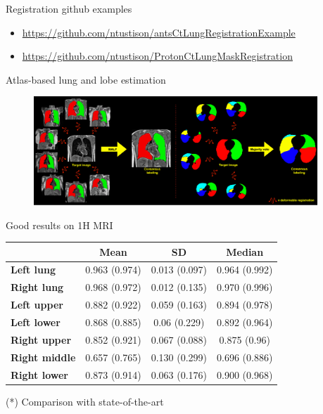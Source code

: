 \documentclass[ignorenonframetext,]{beamer}
\begin{document}
\begin{frame}{Registration github examples}

\begin{itemize}
\item
  \url{https://github.com/ntustison/antsCtLungRegistrationExample}
\item
  \url{https://github.com/ntustison/ProtonCtLungMaskRegistration}
\end{itemize}

\end{frame}

\begin{frame}{Atlas-based lung and lobe estimation}

\centering

\begin{figure}
\includegraphics[width=0.95\textwidth]{./lung/figures/malfLungsBoth.pdf}
\end{figure}

\end{frame}

\begin{frame}{Good results on 1H MRI}

\begin{longtable}[c]{@{}lccc@{}}
\toprule
& \textbf{Mean} & \textbf{SD} & \textbf{Median}\tabularnewline
\midrule
\endhead
\textbf{Left lung} & 0.963 (0.974) & 0.013 (0.097) & 0.964
(0.992)\tabularnewline
\textbf{Right lung} & 0.968 (0.972) & 0.012 (0.135) & 0.970
(0.996)\tabularnewline
\textbf{Left upper} & 0.882 (0.922) & 0.059 (0.163) & 0.894
(0.978)\tabularnewline
\textbf{Left lower} & 0.868 (0.885) & 0.06 (0.229) & 0.892
(0.964)\tabularnewline
\textbf{Right upper} & 0.852 (0.921) & 0.067 (0.088) & 0.875
(0.96)\tabularnewline
\textbf{Right middle} & 0.657 (0.765) & 0.130 (0.299) & 0.696
(0.886)\tabularnewline
\textbf{Right lower} & 0.873 (0.914) & 0.063 (0.176) & 0.900
(0.968)\tabularnewline
\bottomrule
\end{longtable}

(*) Comparison with state-of-the-art

\end{frame}
\end{document}
